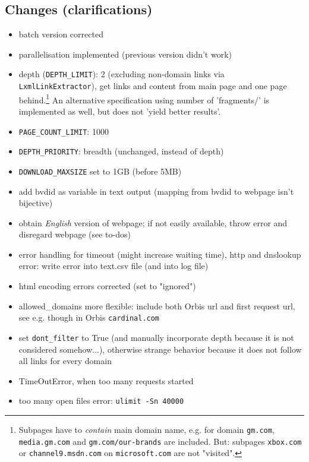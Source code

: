 \documentclass[12pt]{article}
\begin{document}
\subsection{Changes {\small (clarifications)}}
\begin{itemize}
	\item batch version corrected
	\item parallelisation implemented (previous version didn't work)
	\item depth (\texttt{DEPTH\_LIMIT}): 2 (excluding non-domain links via \texttt{LxmlLinkExtractor}), 
	get links and content from main page and one page behind.\footnote{Subpages have to \textit{contain} main domain name, e.g. for domain \texttt{gm.com}, \texttt{media.gm.com} and \texttt{gm.com/our-brands} are included. But: subpages \texttt{xbox.com} or \texttt{channel9.msdn.com} on \texttt{microsoft.com} are not "visited".} An alternative specification using number of 'fragments/' is implemented as well, but does not 'yield better results'.
	\item \texttt{PAGE\_COUNT\_LIMIT}: 1000 
	\item \texttt{DEPTH\_PRIORITY}: breadth (unchanged, instead of depth)
	\item \texttt{DOWNLOAD\_MAXSIZE} set to 1GB (before 5MB)
	\item add bvdid as variable in text output (mapping from bvdid to webpage isn't bijective)
	\item obtain \textit{English} version of webpage; if not easily available, throw error and disregard webpage (see to-dos)
	\item error handling for timeout (might increase waiting time), http and dnslookup error: write error into text.csv file (and into log file)	
	\item html encoding errors corrected (set to "ignored")
	\item {allowed\_domains} more flexible: include both Orbis url and first request url, see e.g. \texttt{} though in Orbis \texttt{cardinal.com}\\
	\item set \texttt{dont\_filter} to True (and manually incorporate depth because it is not considered somehow...), otherwise strange behavior because it does not follow all links for every domain
	\item TimeOutError, when too many requests started
	\item too many open files error: \texttt{ulimit -Sn 40000}
\end{itemize}
\end{document}
